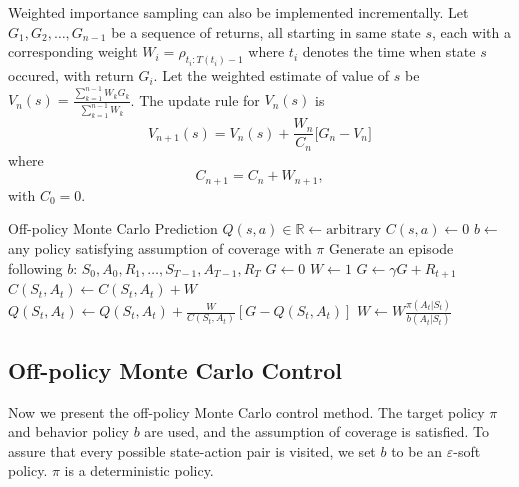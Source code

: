 \documentclass[../../main.tex]{subfiles}
\begin{document}
            Weighted importance sampling can also be implemented incrementally. Let $G_1,G_2,\dots,G_{n-1}$ be a sequence of returns, all starting in same state $s$,
            each with a corresponding weight $W_i = \rho_{t_i:T(t_i)-1}$ where $t_i$ denotes the time when state $s$ occured, with return $G_i$.
            Let the weighted estimate of value of $s$ be $V_n(s)=\frac{\sum_{k=1}^{n-1}W_kG_k}{\sum_{k=1}^{n-1}W_k}$. The update rule for $V_n(s)$ is 
            \begin{equation}
                V_{n+1}(s) = V_n(s) + \frac{W_n}{C_n}\Big[ G_n - V_n \Big]
            \end{equation}
            where
            \begin{equation}
                C_{n+1} = C_n + W_{n+1},
            \end{equation}
            with $C_0=0$.

            {Off-policy Monte Carlo Prediction}
            {}
            {}
            {
                {
                    $Q(s,a) \in \mathbb{R} \leftarrow \text{arbitrary}$\;
                    $C(s,a) \leftarrow 0$\;
                }
                {
                    $b \leftarrow $ any policy satisfying assumption of coverage with $\pi$\;
                    Generate an episode following $b$: $S_0, A_0, R_1, \dots, S_{T-1}, A_{T-1}, R_T$\;
                    $G \leftarrow 0$\;
                    $W \leftarrow 1$\;
                    {
                        $G \leftarrow \gamma G + R_{t+1}$\;
                        $C(S_t,A_t) \leftarrow C(S_t,A_t) + W$\;
                        $Q(S_t,A_t) \leftarrow Q(S_t,A_t) + \frac{W}{C(S_t,A_t)}[G - Q(S_t,A_t)]$\;
                        $W \leftarrow W \frac{\pi(A_t|S_t)}{b(A_t|S_t)}$
                    }
                }
            }

    \subsection{Off-policy Monte Carlo Control}
        Now we present the off-policy Monte Carlo control method. The target policy $\pi$ and behavior policy $b$ are used,
        and the assumption of coverage is satisfied. To assure that every possible state-action pair is visited, we set $b$ to be 
        an $\varepsilon$-soft policy. $\pi$ is a deterministic policy.
        
\end{document}
